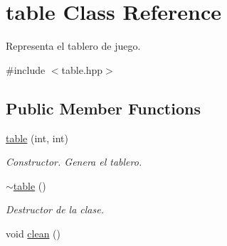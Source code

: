 \hypertarget{classtable}{\section{table Class Reference}
\label{classtable}
}


Representa el tablero de juego.  




{\ttfamily \#include $<$table.\-hpp$>$}

\subsection*{Public Member Functions}
\begin{DoxyCompactItemize}
\item 
\hyperlink{classtable_aacfc6b1c941dccd32e291032c77d34c7}{table} (int, int)
\begin{DoxyCompactList}\small\item\em Constructor. Genera el tablero. \end{DoxyCompactList}\item 
\hypertarget{classtable_a314d9cf6ee35be9ac221982599a57d8d}{\hyperlink{classtable_a314d9cf6ee35be9ac221982599a57d8d}{$\sim$table} ()}\label{classtable_a314d9cf6ee35be9ac221982599a57d8d}

\begin{DoxyCompactList}\small\item\em Destructor de la clase. \end{DoxyCompactList}\item 
\hypertarget{classtable_a88d91f03d9e95a16d6b319bf77ee44c6}{void \hyperlink{classtable_a88d91f03d9e95a16d6b319bf77ee44c6}{clean} ()}\label{classtable_a88d91f03d9e95a16d6b319bf77ee44c6}


\end{DoxyCompactItemize}
